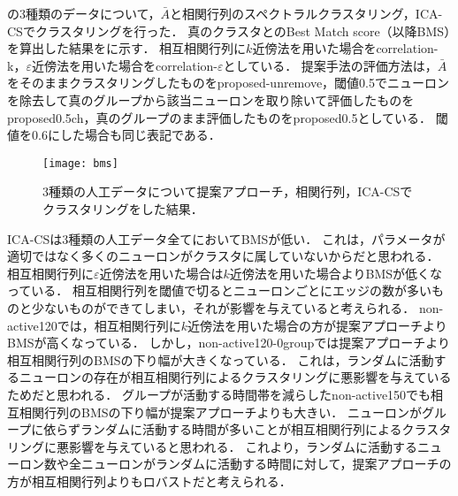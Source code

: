の3種類のデータについて，$\bar{A}$と相関行列のスペクトラルクラスタリング，ICA-CSでクラスタリングを行った．
真のクラスタとのBest Match score（以降BMS）を算出した結果をに示す．
相互相関行列に$k$近傍法を用いた場合をcorrelation-k，$\varepsilon$近傍法を用いた場合をcorrelation-$\varepsilon$としている．
提案手法の評価方法は，$\bar{A}$をそのままクラスタリングしたものをproposed-unremove，閾値0.5でニューロンを除去して真のグループから該当ニューロンを取り除いて評価したものをproposed0.5ch，真のグループのまま評価したものをproposed0.5としている．
閾値を0.6にした場合も同じ表記である．
\begin{figure}[htbp]
    \begin{center}
        \texttt{[image: bms]}
        \caption{3種類の人工データについて提案アプローチ，相関行列，ICA-CSでクラスタリングをした結果．}
        \label{fig:bms}
    \end{center}
\end{figure}
ICA-CSは3種類の人工データ全てにおいてBMSが低い．
これは，パラメータが適切ではなく多くのニューロンがクラスタに属していないからだと思われる．
相互相関行列に$\varepsilon$近傍法を用いた場合は$k$近傍法を用いた場合よりBMSが低くなっている．
相互相関行列を閾値で切るとニューロンごとにエッジの数が多いものと少ないものができてしまい，それが影響を与えていると考えられる．
non-active120では，相互相関行列に$k$近傍法を用いた場合の方が提案アプローチよりBMSが高くなっている．
しかし，non-active120-0groupでは提案アプローチより相互相関行列のBMSの下り幅が大きくなっている．
これは，ランダムに活動するニューロンの存在が相互相関行列によるクラスタリングに悪影響を与えているためだと思われる．
グループが活動する時間帯を減らしたnon-active150でも相互相関行列のBMSの下り幅が提案アプローチよりも大きい．
ニューロンがグループに依らずランダムに活動する時間が多いことが相互相関行列によるクラスタリングに悪影響を与えていると思われる．
これより，ランダムに活動するニューロン数や全ニューロンがランダムに活動する時間に対して，提案アプローチの方が相互相関行列よりもロバストだと考えられる．

